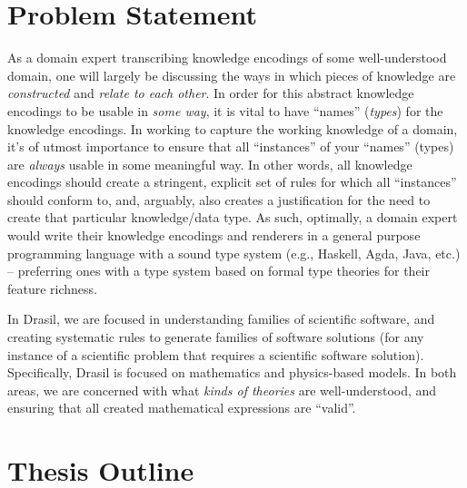 
\section{Problem Statement}


As a domain expert transcribing knowledge encodings of some
well\hyp{}understood domain, one will largely be discussing the ways in which
pieces of knowledge are \textit{constructed} and \textit{relate to each other}.
In order for this abstract knowledge encodings to be usable in \textit{some way},
it is vital to have ``names'' (\textit{types}) for the knowledge encodings. In
working to capture the working knowledge of a domain, it's of utmost importance
to ensure that all ``instances'' of your ``names'' (types) are \textit{always}
usable in some meaningful way. In other words, all knowledge encodings should
create a stringent, explicit set of rules for which all ``instances'' should
conform to, and, arguably, also creates a justification for the need to create
that particular knowledge/data type. As such, optimally, a domain expert would
write their knowledge encodings and renderers in a general purpose programming
language with a sound type system (e.g., Haskell, Agda, Java, etc.) -- preferring
ones with a type system based on formal type theories for their feature richness.

In Drasil, we are focused in understanding families of scientific software, and
creating systematic rules to generate families of software solutions (for any
instance of a scientific problem that requires a scientific software solution).
Specifically, Drasil is focused on mathematics and physics-based models. In both
areas, we are concerned with what \textit{kinds of theories} are
well\hyp{}understood, and ensuring that all created mathematical expressions are
``valid''. 

\section{Thesis Outline}
